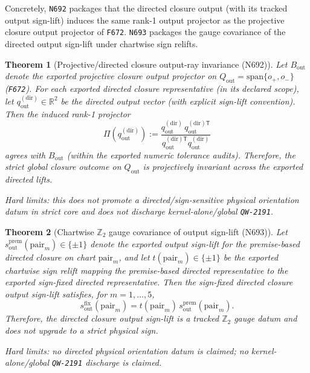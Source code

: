 \documentclass[11pt,a4paper]{article}
\newtheorem{theorem}{Theorem}[section]
\begin{document}
Concretely, \texttt{N692} packages that the directed closure output (with its tracked output sign-lift) induces the same rank‑1 output projector
as the projective closure output projector of \texttt{F672}.
\texttt{N693} packages the gauge covariance of the directed output sign-lift under chartwise sign relifts.

\begin{theorem}[Projective/directed closure output-ray invariance (N692)]
Let $B_{\mathrm{out}}$ denote the exported projective closure output projector on $Q_{\mathrm{out}}=\mathrm{span}\{o_+,o_-\}$ (\texttt{F672}).
For each exported directed closure representative (in its declared scope), let $q_{\mathrm{out}}^{(\mathrm{dir})}\in\mathbb{R}^2$ be the directed output vector (with explicit sign-lift convention).
Then the induced rank-1 projector
\[
\Pi\!\left(q_{\mathrm{out}}^{(\mathrm{dir})}\right)
:=
\frac{q_{\mathrm{out}}^{(\mathrm{dir})}\,q_{\mathrm{out}}^{(\mathrm{dir})\mathsf T}}{q_{\mathrm{out}}^{(\mathrm{dir})\mathsf T}q_{\mathrm{out}}^{(\mathrm{dir})}}
\]
agrees with $B_{\mathrm{out}}$ (within the exported numeric tolerance audits).
Therefore, the strict global closure outcome on $Q_{\mathrm{out}}$ is projectively invariant across the exported directed lifts.

\emph{Hard limits:} this does not promote a directed/sign-sensitive physical orientation datum in strict core and does not discharge kernel-alone/global \texttt{QW-2191}.
\end{theorem}

\begin{theorem}[Chartwise \texorpdfstring{$\mathbb{Z}_2$}{Z2} gauge covariance of output sign-lift (N693)]
Let $s_{\mathrm{out}}^{\mathrm{prem}}(\mathrm{pair}_m)\in\{\pm1\}$ denote the exported output sign-lift for the premise-based directed closure on chart $\mathrm{pair}_m$,
and let $t(\mathrm{pair}_m)\in\{\pm1\}$ be the exported chartwise sign relift mapping the premise-based directed representative to the exported sign-fixed directed representative.
Then the sign-fixed directed closure output sign-lift satisfies, for $m=1,\dots,5$,
\[
s_{\mathrm{out}}^{\mathrm{fix}}(\mathrm{pair}_m) = t(\mathrm{pair}_m)\,s_{\mathrm{out}}^{\mathrm{prem}}(\mathrm{pair}_m).
\]
Therefore, the directed closure output sign-lift is a tracked $\mathbb{Z}_2$ gauge datum and does not upgrade to a strict physical sign.

\emph{Hard limits:} no directed physical orientation datum is claimed; no kernel-alone/global \texttt{QW-2191} discharge is claimed.
\end{theorem}
\end{document}
